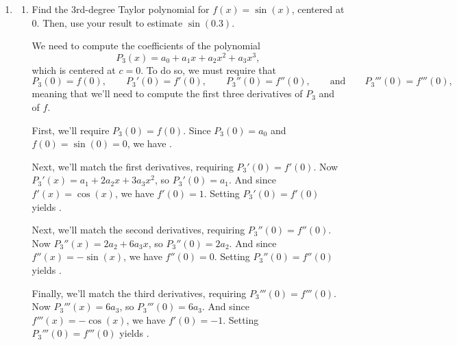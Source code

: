 \documentclass[main]{subfiles}
\begin{document}
\begin{enumerate}
\item 

\begin{enumerate}
  \item \label{sine}
  \begin{problem}[3in]
     Find the 3rd-degree Taylor polynomial for $f(x) = \sin(x)$, centered at $0$.
     Then, use your result to estimate $\sin(0.3)$.
  \end{problem}

  \begin{solution}
     We need to compute the coefficients of the polynomial
     $$
       P_{3}(x) = a_0 + a_1 x + a_2 x^2 + a_3 x^3,
     $$
     which is centered at $c = 0$.  To do so, we must require that
     $$
     P_{3}(0) = f(0), \qquad P_{3}'(0) = f'(0), \qquad P_{3}''(0) = f''(0), \qquad \mbox{and} \qquad
     P_{3}'''(0) = f'''(0),
     $$
     meaning that we'll need to compute the first three derivatives of $P_{3}$ and of $f$.

     First, we'll require $P_{3}(0) = f(0)$.
     Since $P_{3}(0) = a_0$ and $f(0) = \sin(0) = 0$, we have .

     Next, we'll match the first derivatives, requiring $P_{3}'(0) = f'(0)$.  
     Now $P_{3}'(x) = a_1 + 2a_2 x + 3a_3 x^2$,
     so $P_{3}'(0) = a_1$.  And since $f'(x) = \cos(x)$, we have $f'(0) = 1$.  Setting
     $P_{3}'(0) = f'(0)$ yields .

     Next, we'll match the second derivatives, requiring $P_{3}''(0) = f''(0)$.  
     Now $P_{3}''(x) = 2a_2  + 6 a_3 x$,
     so $P_{3}''(0) = 2a_2$.  And since $f''(x) = -\sin(x)$, we have $f''(0) = 0$.  Setting
     $P_{3}''(0) = f''(0)$ yields .

     Finally, we'll match the third derivatives, requiring $P_{3}'''(0) = f'''(0)$.  
     Now $P_{3}'''(x) = 6 a_3$,
     so $P_{3}'''(0) = 6 a_3$.  And since $f'''(x) = -\cos(x)$, we have $f'(0) = -1$.  Setting
     $P_{3}'''(0) = f'''(0)$ yields .


\end{solution}
\end{enumerate}
\end{enumerate}
\end{document}
